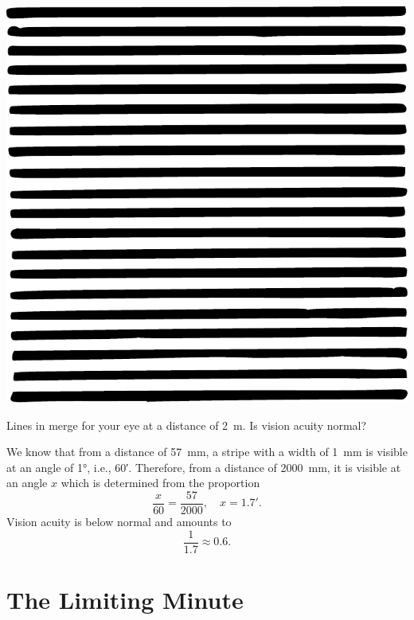 \begin{marginfigure}%
\centering
\includegraphics[width=\textwidth]{figures/ch-03/fig-073.pdf}
\end{marginfigure}



\ques Lines in  merge for your eye at a distance of \SI{2}{\meter}. Is vision acuity normal? 

\ans We know that from a distance of \SI{57}{\milli\meter}, a stripe with a width of \SI{1}{\milli\meter} is visible at an angle of \ang{1}, i.e., \ang{;60}. Therefore, from a distance of \SI{2000}{\milli\meter}, it is visible at an angle $x$ which is determined from the proportion 
\begin{equation*}%
\frac{x}{60} = \frac{57}{2000}, \quad x = \ang{;1.7}.
\end{equation*}
Vision acuity is below normal and amounts to
\begin{equation*}%
\frac{1}{1.7} \approx 0.6.
\end{equation*}


\section{The Limiting Minute}
\label{sec-3.12}

